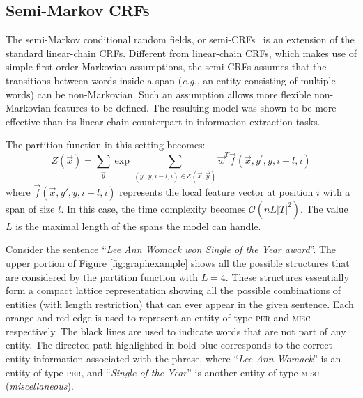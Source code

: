 \subsection{Semi-Markov CRFs}
The semi-Markov conditional random fields, or semi-CRFs~\cite{sarawagi2004semi} is an extension of the standard linear-chain CRFs.
Different from linear-chain CRFs, which makes use of simple first-order Markovian assumptions, the semi-CRFs
assumes that the transitions between words inside a span ({\em e.g.}, an entity consisting of multiple words) can be non-Markovian.
Such an assumption allows more flexible non-Markovian features to be defined.
The resulting model was shown to be more effective than its linear-chain counterpart in information extraction tasks.


The partition function in this setting becomes:
\begin{equation}
Z(\vec{x}) = 
\sum_\vec{y}
\exp \!\!\!\!\! \!\!\!\!\!
\sum_{(y^\prime, y, i-l,i) \in \mathcal{E}(\vec{x}, \vec{y})}
\!\!\!\! \!\!\!\!\!
\vec{w}^{T}\vec{f}(\vec{x}, y^\prime, y, i-l,i)
\end{equation}
where $\vec{f}(\vec{x},y', y, i-l, i)$ represents the local feature vector at position $i$ with a span of size $l$. In this case, the time complexity becomes $\mathcal{O} (nL|T|^{2})$.
The value $L$ is the maximal length of the spans the model can handle.

Consider the sentence ``{\em Lee Ann Womack won Single of the Year award}''.
The upper portion of Figure \ref{fig:graphexample} shows all the possible structures that are considered by the partition function with $L=4$.
These structures essentially form a compact lattice representation showing all the possible combinations of entities (with length restriction)
that can ever appear in the given sentence.
Each orange and red edge is used to represent an entity of type \textsc{per} and \textsc{misc} respectively.
The black lines are used to indicate words that are not part of any entity.
The directed path highlighted in bold blue  corresponds to the correct  entity information associated with the phrase, where ``{\em Lee Ann Womack}'' is an entity of type \textsc{per}, and ``{\em Single of the Year}'' is another entity of  type \textsc{misc} ({\em miscellaneous}).



